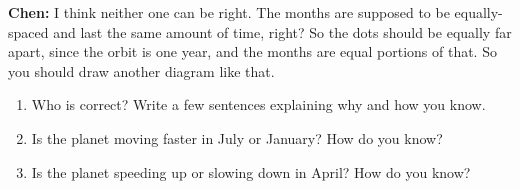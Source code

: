 \documentclass[12pt]{article}
\begin{document}
{\bf Chen:} I think neither one can be right. The months are supposed to be equally-spaced and last the same amount of time, right? So the dots should be equally far apart, since the orbit is one year, and the months are equal portions of that. So you should draw another diagram like that.
\begin{enumerate}	

\item Who is correct? Write a few sentences explaining why and how you know.


\vspace{3in}

\item Is the planet moving faster in July or January? How do you know?


\vspace{1.5in}

\item Is the planet speeding up or slowing down in April? How do you know?

\vspace{1.5in}
	
\end{enumerate}


	
\end{document}
